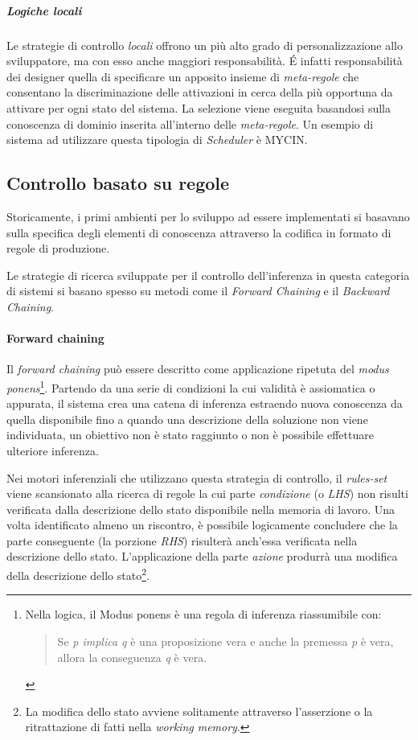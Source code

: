 \subparagraph{Logiche locali} Le strategie di controllo \emph{locali} offrono un più alto grado di personalizzazione allo sviluppatore, ma con esso anche maggiori responsabilità. \'E infatti responsabilità dei designer quella di specificare un apposito insieme di \emph{meta-regole} che consentano la discriminazione delle attivazioni in cerca della più opportuna da attivare per ogni stato del sistema. La selezione viene eseguita basandosi sulla conoscenza di dominio inserita all'interno delle \emph{meta-regole}. Un esempio di sistema ad utilizzare questa tipologia di \emph{Scheduler} è MYCIN.

\subsection{Controllo basato su regole}
Storicamente, i primi ambienti per lo sviluppo ad essere implementati si basavano sulla specifica degli elementi di conoscenza attraverso la codifica in formato di regole di produzione.

Le strategie di ricerca sviluppate per il controllo dell'inferenza in questa categoria di sistemi si basano spesso su metodi come il \emph{Forward Chaining} e il \emph{Backward Chaining}.

\paragraph{Forward chaining}
Il \emph{forward chaining} può essere descritto come applicazione ripetuta del \emph{modus ponens}\footnote{Nella logica, il Modus ponens è una regola di inferenza riassumibile con: \begin{quote}
Se \emph{p implica q} è una proposizione vera e anche la premessa \emph{p} è vera, allora la conseguenza \emph{q} è vera.
\end{quote}}. Partendo da una serie di condizioni la cui validità è assiomatica o appurata, il sistema crea una catena di inferenza estraendo nuova conoscenza da quella disponibile fino a quando una descrizione della soluzione non viene individuata, un obiettivo non è stato raggiunto o non è possibile effettuare ulteriore inferenza.

Nei motori inferenziali che utilizzano questa strategia di controllo, il \emph{rules-set} viene scansionato alla ricerca di regole la cui parte \emph{condizione} (o \emph{LHS}) non risulti verificata dalla descrizione dello stato disponibile nella memoria di lavoro. Una volta identificato almeno un riscontro, è possibile logicamente concludere che la parte conseguente (la porzione \emph{RHS}) risulterà anch'essa verificata nella descrizione dello stato. L'applicazione della parte \emph{azione} produrrà una modifica della descrizione dello stato\footnote{La modifica dello stato avviene solitamente attraverso l'asserzione o la ritrattazione di fatti nella \emph{working memory}.}.

